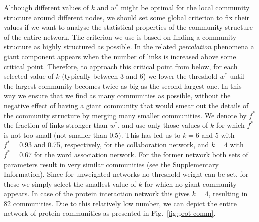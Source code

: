 \documentclass[11pt,a4paper]{article}
\begin{document}
Although different values of $k$ and $w^*$ might be optimal for the
local community structure around different nodes, we should set some
global criterion to fix their values if we want to analyse the
statistical properties of the community structure of the entire
network. The criterion we use is based on finding a community
structure as highly structured as possible. In the related
\emph{percolation} phenomena
\cite{clique-percolation}
a giant component appears when the number of links is
increased above some critical point. Therefore,
to approach this critical point from below,
for each selected value of
$k$ (typically between 3 and 6) we lower the threshold $w^*$ 
until the largest community becomes
twice as big as the second largest one. In this way we ensure that we
find as many communities as possible, without the negative effect of
having a giant community that would smear out the details of the
community structure by merging many smaller
communities. We denote by $f^*$ the fraction of links stronger than $w^*$,
and use only those values of $k$ for which $f^*$ is not too
small (not smaller than 0.5). This has led us to $k=6$ and 5 with
$f^*=0.93$ and 0.75, respectively, for the collaboration network, and
$k=4$ with $f^*=0.67$ for the word association network.
For the former network both
sets of parameters result in very similar communities
(see the Supplementary Information). Since for
unweighted networks no threshold weight can be set, for these we
simply select the smallest value of $k$ for which no giant community
appears.  In case of the protein interaction
network this gives $k=4$, resulting in 82 communities.
Due to this relatively low number,
we can depict the entire network of protein communities
as presented in Fig.~\ref{fig:prot-comm}.
\end{document}

